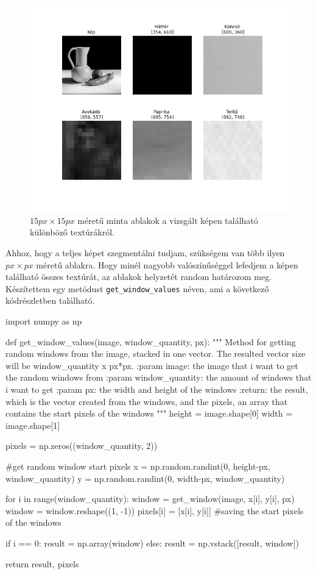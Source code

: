 \begin{figure}[h]
\centering
\includegraphics[scale=0.6]{images/window_example.png}
\caption{$15px\times 15px$ méretű minta ablakok a vizsgált képen található különböző textúrákról.}
\label{fig:window_example}
\end{figure}

Ahhoz, hogy a teljes képet szegmentálni tudjam, szükségem van több ilyen $px \times px$ méretű ablakra. Hogy minél nagyobb valószínűséggel lefedjem a képen található összes textúrát, az ablakok helyzetét random határozom meg. Készítettem egy metódust \texttt{get\_window\_values} néven, ami a következő kódrészletben található.
\begin{python}
import numpy as np

def get_window_values(image, window_quantity, px):
    """
    Method for getting random windows from the image,
    stacked in one vector.
    The resulted vector size will be window_quantity x px*px.
    :param image: the image that i want to get the random windows from
    :param window_quantity: the amount of windows that i want to get
    :param px: the width and height of the windows
    :return: the result, which is the vector created from the windows,
        and the pixels, an array that contains the start pixels
        of the windows
    """
    height = image.shape[0]
    width = image.shape[1]

    pixels = np.zeros((window_quantity, 2))

    #get random window start pixels
    x = np.random.randint(0, height-px, window_quantity)
    y = np.random.randint(0, width-px, window_quantity)

    for i in range(window_quantity):
        window = get_window(image, x[i], y[i], px)
        window = window.reshape((1, -1))
        pixels[i] = [x[i], y[i]] #saving the start pixels of the windows

        if i == 0:
            result = np.array(window)
        else:
            result = np.vstack([result, window])

    return result, pixels
\end{python}

